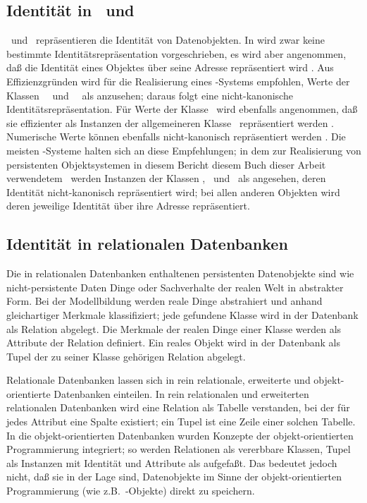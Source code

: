 \subsection{Identit\"{a}t in \protect\cl\ und \protect\clos}
%
\cl\ und \clos\ repr\"{a}sentieren die Identit\"{a}t von
Datenobjekten. In \cite{bib:st90} wird zwar keine bestimmte
Identit\"{a}tsrepr\"{a}sentation vorgeschrieben, es wird aber
angenommen, da\ss{} die Iden\-ti\-t\"{a}t eines Objektes \"{u}ber
seine Adresse repr\"{a}sentiert wird . Aus
Effizienzgr\"{u}nden wird f\"{u}r die Realisierung eines \cl-Systems
empfohlen, Werte der Klassen \ \ und
\ \ als \immval[s]\/ anzusehen; daraus
folgt eine nicht-kanonische Identit\"{a}tsrepr\"{a}sentation. F\"{u}r
Werte der Klasse \ wird ebenfalls angenommen, da\ss{}
sie effizienter als Instanzen der allgemeineren Klasse
\ repr\"{a}sentiert werden . Numerische
Werte k\"{o}nnen ebenfalls nicht-kanonisch repr\"{a}sentiert werden
. Die meisten \cl-Systeme halten sich an diese
Empfehlungen; in dem zur Realisierung von persistenten Objektsystemen
in \ifbericht diesem Bericht \else\ifbuch diesem Buch \else dieser
Arbeit \fi\fi verwendetem \lwcl\ werden Instanzen der Klassen
, \ und \ als
\immval[s]\/ angesehen, deren Identit\"{a}t nicht-kanonisch
repr\"{a}sentiert wird; bei allen anderen Objekten wird deren
jeweilige Identit\"{a}t \"{u}ber ihre Adresse repr\"{a}sentiert.
%
\subsection{Identit\"{a}t in relationalen Datenbanken}
%
Die in relationalen Datenbanken enthaltenen persistenten Datenobjekte
sind wie nicht-per\-si\-sten\-te Daten Dinge oder Sachverhalte der
realen Welt in abstrakter Form. Bei der Modellbildung werden reale
Dinge abstrahiert und anhand gleichartiger Merkmale klassifiziert;
jede gefundene Klasse wird in der Datenbank als Relation abgelegt.
Die Merkmale der realen Dinge einer Klasse werden als Attribute der
Relation definiert. Ein reales Objekt wird in der Datenbank als Tupel
der zu seiner Klasse geh\"{o}rigen Relation abgelegt.
%
\par{}Relationale Datenbanken lassen sich in rein relationale,
erweiterte und objekt-orientierte Datenbanken einteilen. In
rein relationalen und erweiterten relationalen Datenbanken wird eine
Relation als Tabelle verstanden, bei der f\"{u}r jedes Attribut eine
Spalte existiert; ein Tupel ist eine Zeile einer
solchen Tabelle. In die objekt-orientierten Datenbanken wurden
Konzepte der objekt-orientierten Programmierung integriert; so
werden Relationen als vererbbare Klassen, Tupel als Instanzen mit
Identit\"{a}t und Attribute als \Slt[s]\/ aufgefa\ss{}t. Das bedeutet jedoch
nicht, da\ss{} sie in der Lage sind, Datenobjekte im Sinne der
objekt-orientierten Programmierung (wie z.B.\ \clos-Objekte) direkt zu
speichern.
%

